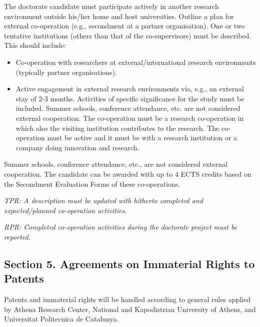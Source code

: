 \documentclass[12pt]{article}
\begin{document}
The doctorate candidate must participate actively in another research environment outside his/her home and host universities.
Outline a plan for external co-operation (e.g., secondment at a partner organisation).
One or two tentative institutions (others than that of the co-supervisors) must be described. \\
This should include:
\begin{itemize}
\item Co-operation with researchers at external/international research environments (typically partner organisations).
\item Active engagement in external research environments via, e.g., an external stay of 2-3 months.
Activities of specific significance for the study must be included. Summer schools, conference attendance, etc. are not considered external cooperation. The co-operation must be a research co-operation in which also the visiting institution contributes to the research. The co-operation must be active and it must be with a research institution or a company doing innovation and research.
\end{itemize}

Summer schools, conference attendance, etc., are not considered external cooperation.
The candidate can be awarded with up to 4 ECTS credits based on the Secondment Evaluation Forms of these co-operations.

\begin{shaded}
\noindent
\emph{TPR: A description must be updated with hitherto completed and expected/planned co-operation activities.}

\noindent
\emph{RPR: Completed co-operation activities during the doctorate project must be reported.}
\end{shaded}

\subsection*{Section 5. Agreements on Immaterial Rights to Patents}

Patents and immaterial rights will be handled according to general rules applied by Athena Research Center, National and Kapodistrian University of Athens, and Universitat Politecnica de Catalunya.


\end{document}
